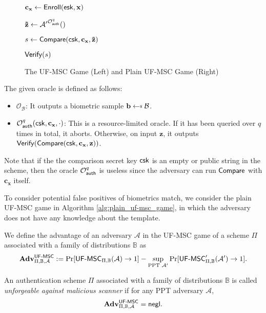 \begin{figure}[h]
\begin{minipage}[t]{0.45\linewidth}
\begin{algorithm}[H]
\begin{algorithmic}[1]
		\State $\mathbf{c_x} \gets {\sf Enroll}({\sf esk}, \mathbf{x})$

		\State ${\mathbf{\tilde{z}}} \gets \mathcal{A'}^{\mathcal{O}_{\sf auth}^{q}}()$

		\State $s \gets {\sf Compare}( {\sf csk}, \mathbf{c_x}, \mathbf{\tilde{z}} )$

		\State \Return ${\sf Verify}(s)$
	\end{algorithmic}
	\end{algorithm}
	\end{minipage}

\caption{The \textsf{UF-MSC} Game (Left) and Plain \textsf{UF-MSC} Game (Right)}
\label{fig:uf-msc_game}
\end{figure}

The given oracle is defined as follows:

\begin{itemize}
	\item $\mathcal{O}_{\mathcal{B}}$: It outputs a biometric sample $\mathbf{b} \getsdollar \mathcal{B}$.

	\item $\mathcal{O}_{\sf auth}^{q}({\sf csk}, \mathbf{c_x}, \cdot)$: This is a resource-limited oracle. If it has been queried over $q$ times in total, it aborts. Otherwise, on input $\mathbf{z}$, it outputs ${\sf Verify}({\sf Compare}({\sf csk}, \mathbf{c_x}, \mathbf{z}))$.
\end{itemize}

Note that if the the comparison secret key ${\sf csk}$ is an empty or public string in the scheme, then the oracle $\mathcal{O}_{\sf auth}^{q}$ is useless since the adversary can run $\sf Compare$ with $\mathbf{c_x}$ itself.

To consider potential false positives of biometrics match, we consider the plain \textsf{UF-MSC} game in Algorithm \ref{alg:plain_uf-msc_game}, in which the adversary does not have any knowledge about the template.

We define the advantage of an adversary $\mathcal{A}$ in the \textsf{UF-MSC} game of a scheme $\Pi$ associated with a family of distributions $\mathbb{B}$ as
\[
	\mathbf{Adv}^{\textsf{UF-MSC}}_{\Pi, \mathbb{B}, \mathcal{A}} := \Pr[{\textsf{UF-MSC}}_{\Pi, \mathbb{B}}(\mathcal{A}) \to 1] -
	\sup_{\text{PPT } \mathcal{A'}} \Pr[\textsf{UF-MSC}^\prime_{\Pi, \mathbb{B}}(\mathcal{A'}) \to 1].
\]

An authentication scheme $\Pi$ associated with a family of distributions $\mathbb{B}$ is called \emph{unforgeable against malicious scanner} if for any PPT adversary $\mathcal{A}$,
\[
	\mathbf{Adv}^{\textsf{UF-MSC}}_{\Pi, \mathbb{B}, \mathcal{A}} = \mathsf{negl}.
\]

